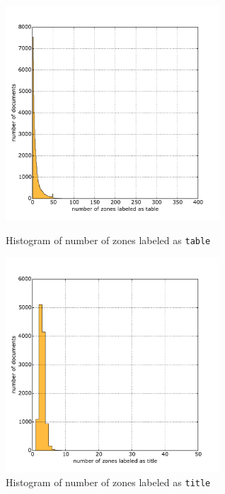 \begin{appendix}
  \begin{figure}
\centering
\begin{minipage}[t!]{0.48\linewidth}
  \includegraphics[width=8cm]{plots/table_histogram}
  \caption{Histogram of number of zones labeled as \texttt{table}}
  \label{fig:table_histogram}
\end{minipage}
\quad
\begin{minipage}[t!]{0.48\linewidth}
  \includegraphics[width=8cm]{plots/title_histogram}
  \caption{Histogram of number of zones labeled as \texttt{title}}
  \label{fig:title_histogram}
\end{minipage}
\end{figure}


\end{appendix}
